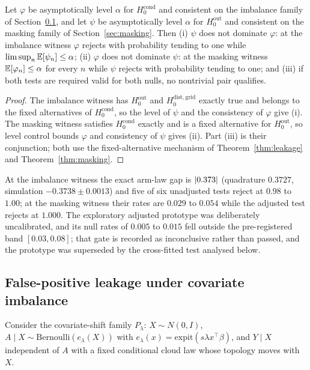 \begin{theorem}
\label{thm:non-dominance}
Let $\varphi$ be asymptotically level $\alpha$ for $H_0^{\mathrm{cond}}$ and consistent on the imbalance family of Section~\ref{sec:leakage}, and let $\psi$ be asymptotically level $\alpha$ for $H_0^{\mathrm{out}}$ and consistent on the masking family of Section~\ref{sec:masking}. Then (i) $\psi$ does not dominate $\varphi$: at the imbalance witness $\varphi$ rejects with probability tending to one while $\limsup_n\mathbb{E}[\psi_n]\le\alpha$; (ii) $\varphi$ does not dominate $\psi$: at the masking witness $\mathbb{E}[\varphi_n]\le\alpha$ for every $n$ while $\psi$ rejects with probability tending to one; and (iii) if both tests are required valid for both nulls, no nontrivial pair qualifies.
\end{theorem}

\begin{proof}
The imbalance witness has $H_0^{\mathrm{out}}$ and $H_0^{\mathrm{dist,grid}}$ exactly true and belongs to the fixed alternatives of $H_0^{\mathrm{cond}}$, so the level of $\psi$ and the consistency of $\varphi$ give (i). The masking witness satisfies $H_0^{\mathrm{cond}}$ exactly and is a fixed alternative for $H_0^{\mathrm{out}}$, so level control bounds $\varphi$ and consistency of $\psi$ gives (ii). Part (iii) is their conjunction; both use the fixed-alternative mechanism of Theorem~\ref{thm:leakage} and Theorem~\ref{thm:masking}.
\end{proof}

At the imbalance witness the exact arm-law gap is $\lvert 0.373\rvert$ (quadrature $0.3727$, simulation $-0.3738\pm0.0013$) and five of six unadjusted tests reject at $0.98$ to $1.00$; at the masking witness their rates are $0.029$ to $0.054$ while the adjusted test rejects at $1.000$. The exploratory adjusted prototype was deliberately uncalibrated, and its null rates of $0.005$ to $0.015$ fell outside the pre-registered band $[0.03,0.08]$; that gate is recorded as inconclusive rather than passed, and the prototype was superseded by the cross-fitted test analysed below.

\subsection{False-positive leakage under covariate imbalance}
\label{sec:leakage}

Consider the covariate-shift family $P_\lambda$: $X\sim N(0,I)$, $A\mid X\sim\mathrm{Bernoulli}(e_\lambda(X))$ with $e_\lambda(x)=\mathrm{expit}(s\lambda x^\top\beta)$, and $Y\mid X$ independent of $A$ with a fixed conditional cloud law whose topology moves with $X$.

